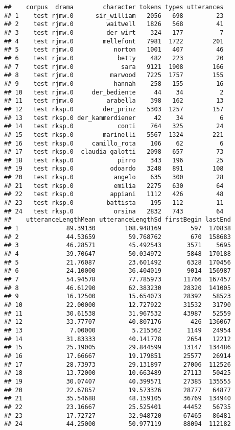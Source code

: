 \documentclass[]{book}
\begin{document}
\begin{verbatim}
##    corpus  drama        character tokens types utterances
## 1    test rjmw.0      sir_william   2056   698         23
## 2    test rjmw.0         waitwell   1826   568         41
## 3    test rjmw.0         der_wirt    324   177          7
## 4    test rjmw.0        mellefont   7981  1722        201
## 5    test rjmw.0           norton   1001   407         46
## 6    test rjmw.0            betty    482   223         20
## 7    test rjmw.0             sara   9121  1908        166
## 8    test rjmw.0          marwood   7225  1757        155
## 9    test rjmw.0           hannah    258   155         16
## 10   test rjmw.0     der_bediente     44    34          2
## 11   test rjmw.0         arabella    398   162         13
## 12   test rksp.0        der_prinz   5303  1257        157
## 13   test rksp.0 der_kammerdiener     42    34          6
## 14   test rksp.0            conti    764   325         24
## 15   test rksp.0        marinelli   5567  1324        221
## 16   test rksp.0     camillo_rota    106    62          6
## 17   test rksp.0  claudia_galotti   2098   657         73
## 18   test rksp.0            pirro    343   196         25
## 19   test rksp.0          odoardo   3248   891        108
## 20   test rksp.0           angelo    635   300         28
## 21   test rksp.0           emilia   2275   630         64
## 22   test rksp.0          appiani   1112   426         48
## 23   test rksp.0         battista    195   112         11
## 24   test rksp.0           orsina   2832   743         64
##    utteranceLengthMean utteranceLengthSd firstBegin lastEnd
## 1             89.39130        108.948169        597  170838
## 2             44.53659         59.768762        670  158683
## 3             46.28571         45.492543       3571    5695
## 4             39.70647         50.034972       5848  170188
## 5             21.76087         23.601492       6328  170456
## 6             24.10000         36.404019       9014  156987
## 7             54.94578         77.785973      11766  167457
## 8             46.61290         62.383230      28320  141005
## 9             16.12500         15.654073      28392   58523
## 10            22.00000         12.727922      31532   31790
## 11            30.61538         31.967532      43987   52559
## 12            33.77707         40.807176        426  136067
## 13             7.00000          5.215362       1149   24954
## 14            31.83333         40.141778       2654   12212
## 15            25.19005         29.844599      13147  134486
## 16            17.66667         19.179851      25577   26914
## 17            28.73973         29.131897      27006  112526
## 18            13.72000         10.663489      27113   50425
## 19            30.07407         40.399571      27385  135555
## 20            22.67857         19.573326      28777   64877
## 21            35.54688         48.159105      36769  134940
## 22            23.16667         25.525401      44452   56735
## 23            17.72727         32.948720      67465   86481
## 24            44.25000         50.977119      88094  112182
\end{verbatim}
\end{document}
